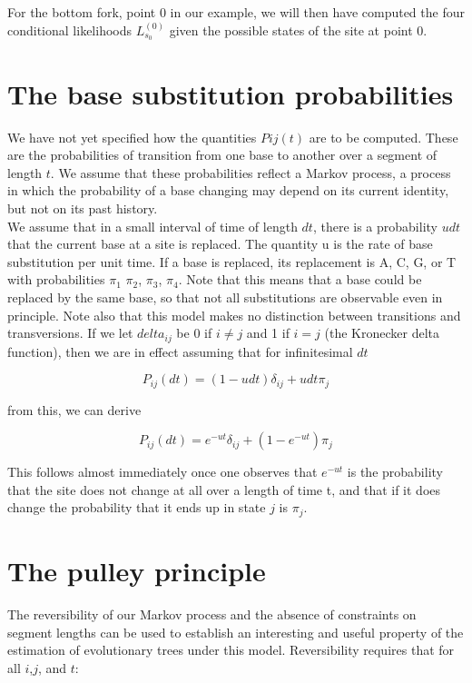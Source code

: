 For the bottom fork, point 0 in our example, we will then have computed the four conditional likelihoods $L_{s_0}^{(0)}$ given the possible states of the site at point 0.

\section{The base substitution probabilities}
We have not yet specified how the quantities $Pij(t)$ are to be computed. These are the probabilities of transition from one base to another over a segment of length $t$. We assume that these probabilities reflect a Markov process, a process in which the probability of a base changing may depend on its current identity, but not on its past history.
\\
We assume that in a small interval of time of length $dt$, there is a probability $u dt$ that the current base at a site is replaced. The quantity u is the rate of base substitution per unit time. 
If a base is replaced, its replacement is A, C, G, or T with probabilities $\pi_1$ $\pi_2$, $\pi_3$, $\pi_4$. Note that this means that a base could be replaced
by the same base, so that not all substitutions are observable even in principle. Note also that this model makes no distinction between transitions and transversions. If we let $delta_{ij}$ be $0$ if $i \neq j$ and 1 if $i = j$ (the
Kronecker delta function), then we are in effect assuming that for infinitesimal $dt$

\begin{equation}
P_{ij}(dt) = (1- u dt) \delta_{ij} + u dt \pi_j
\end{equation}

from this, we can derive 

\begin{equation}\label{eq:7}
P_{ij}(dt) = e^{-ut} \delta_{ij} + (1- e^{-ut}) \pi_j
\end{equation}

This follows almost immediately once one observes that $e^{-ut}$ is the probability that the site does not change at all over a length of time t, and that if it does change the probability that it ends up in state $j$ is $\pi_j$. 

\section{The pulley principle}
The reversibility of our Markov process and the absence of constraints on segment lengths can be used to establish an interesting and useful property of the estimation of evolutionary trees under this model.
Reversibility requires that for all $i$,$j$, and $t$:


